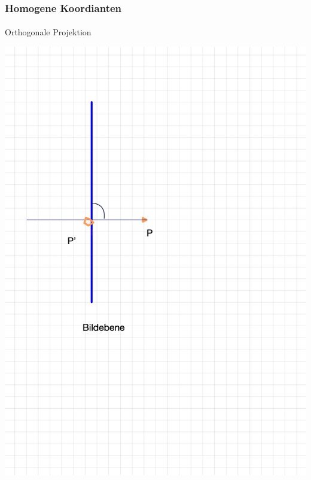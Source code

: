 \documentclass{beamer}
\begin{document}
\begin{frame}
    \frametitle{Homogene Koordianten}
\framesubtitle{}
    \begin{block}{Orthogonale Projektion}
\begin{center}
\includegraphics[scale=0.15]{images/oproj}
\end{center}
\end{block}

\end{frame}
\end{document}
